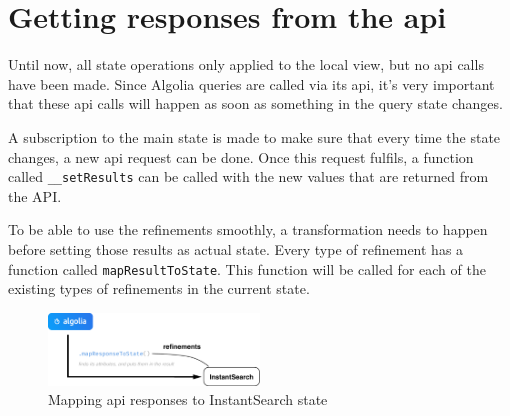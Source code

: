 
\section{Getting responses from the \acrshort{api}} %
\label{sec:getting_responses_from_the_api}

Until now, all state operations only applied to the local view, but no \acrshort{api} calls have been made. Since Algolia queries are called via its \acrshort{api}, it's very important that these \acrshort{api} calls will happen as soon as something in the query state changes. 

A subscription to the main state is made to make sure that every time the state changes, a new \acrshort{api} request can be done. Once this request fulfils, a function called {\tt \_\_setResults} can be called with the new values that are returned from the API.

To be able to use the refinements smoothly, a transformation needs to happen before setting those results as actual state. Every type of refinement has a function called {\tt mapResultToState}. This function will be called for each of the existing types of refinements in the current state.

\begin{figure}[H]
  \centering
  \includegraphics[width=0.5\textwidth, draft]{../assets/results-to-state.pdf}
  \caption{Mapping \acrshort{api} responses to InstantSearch state}
  \label{figure:results-to-state}
\end{figure} %

